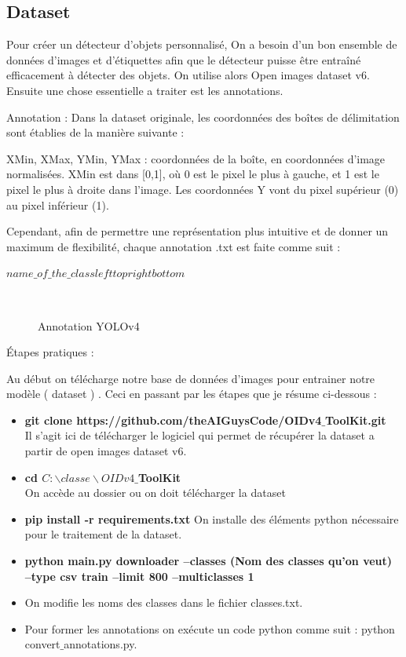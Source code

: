 {\subsection{Dataset}
Pour créer un détecteur d'objets personnalisé, On a  besoin d'un bon ensemble de données d'images et d'étiquettes afin que le détecteur puisse être entraîné efficacement à détecter des objets. On utilise alors Open images dataset v6.
Ensuite une chose essentielle a traiter  est les annotations.

Annotation :
Dans la dataset originale, les coordonnées des boîtes de délimitation sont établies de la manière suivante :

XMin, XMax, YMin, YMax : coordonnées de la boîte, en coordonnées d'image normalisées. XMin est dans [0,1], où 0 est le pixel le plus à gauche, et 1 est le pixel le plus à droite dans l'image. Les coordonnées Y vont du pixel supérieur (0) au pixel inférieur (1).

Cependant, afin de permettre une représentation plus intuitive et de donner un maximum de flexibilité, chaque annotation .txt est faite comme suit :
\begin{center}
    $name\_of\_the\_class left top right bottom$
\end{center}
\begin{figure}[H] 
\centering
{}\\[0.5cm]
\caption{Annotation YOLOv4}
\label{fig:figure18}
\end{figure}

Étapes pratiques :

Au début on télécharge notre base de données d’images pour entrainer notre modèle ( dataset ) . Ceci en passant par les étapes que je résume ci-dessous :


\begin{itemize}
    \item \textbf{git clone https://github.com/theAIGuysCode/OIDv4$\_$ToolKit.git} \\
Il s’agit ici de télécharger le logiciel qui permet de récupérer la dataset a partir de open images dataset v6.
    \item \textbf{cd $C:\backslash classe\backslash OIDv4\_$ToolKit}\\
    On accède au dossier ou on doit télécharger la dataset 
    \item \textbf{pip install -r requirements.txt}
On installe des éléments python nécessaire pour le traitement de la dataset. 
    \item \textbf{python main.py downloader --classes (Nom des classes qu'on veut) --type csv train --limit 800 --multiclasses 1}
    \item On modifie les noms des classes dans le fichier classes.txt.
    \item Pour former les annotations on exécute un code python comme suit  : python convert$\_$annotations.py.
    

\end{itemize}}
